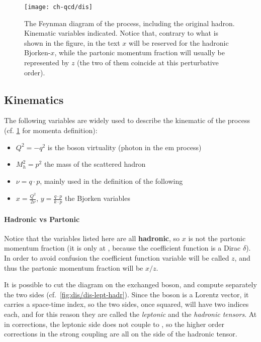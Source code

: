 
\begin{figure}
	\centering
	\texttt{[image: ch-qcd/dis]}
	\caption{
    The \lo Feynman diagram of the \dis process, including the original hadron.
    Kinematic variables indicated. Notice that, contrary to what is shown in
    the figure, in the text $x$ will be reserved for the hadronic Bjorken-$x$,
    while the partonic momentum fraction will usually be represented by $z$
    (the two of them coincide at this perturbative order).
  }
	\label{fig:dis/dis}
\end{figure}

\subsection{Kinematics}

The following variables are widely used to describe the kinematic of the \dis
process (cf. \cref{fig:dis/dis} for momenta definition):
\begin{itemize}
  \item $Q^2 = - q^2$ is the \ew boson virtuality (photon in the \acrshort{em}
    process)
  \item $M_h^2 = p^2$ the mass of the scattered hadron
  \item $\nu = q \cdot p$, mainly used in the definition of the following
  \item $x = \frac{Q^2}{2\nu}$, $y = \frac{q \cdot p}{k \cdot p}$ the Bjorken
    variables
\end{itemize}

\paragraph{Hadronic vs Partonic} Notice that the variables listed here
are all \textbf{hadronic}, so $x$ is not the partonic momentum fraction (it is only
at \lo , because the coefficient function is a Dirac $\delta$).
In order to avoid confusion the coefficient function variable will be called
$z$, and thus the partonic momentum fraction will be $x/z$.
\newline

It is possible to cut the \dis diagram on the exchanged boson, and compute
separately the two sides (cf.\ \cref{fig:dis/dis-lept-hadr}).
Since the boson is a Lorentz vector, it carries a space-time index, so the two
sides, once squared, will have two indices each, and for this reason they are
called the \textit{leptonic} and the \textit{hadronic tensors}.
%
At \lo in \ew corrections, the leptonic side does not couple to \qcd, so the
higher order corrections in the strong coupling are all on the side of the
hadronic tensor.

